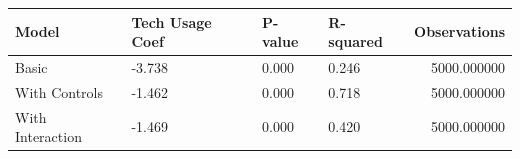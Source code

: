 \begin{tabular}{llllr}
\toprule
Model & Tech Usage Coef & P-value & R-squared & Observations \\
\midrule
Basic & -3.738 & 0.000 & 0.246 & 5000.000000 \\
With Controls & -1.462 & 0.000 & 0.718 & 5000.000000 \\
With Interaction & -1.469 & 0.000 & 0.420 & 5000.000000 \\
\bottomrule
\end{tabular}

